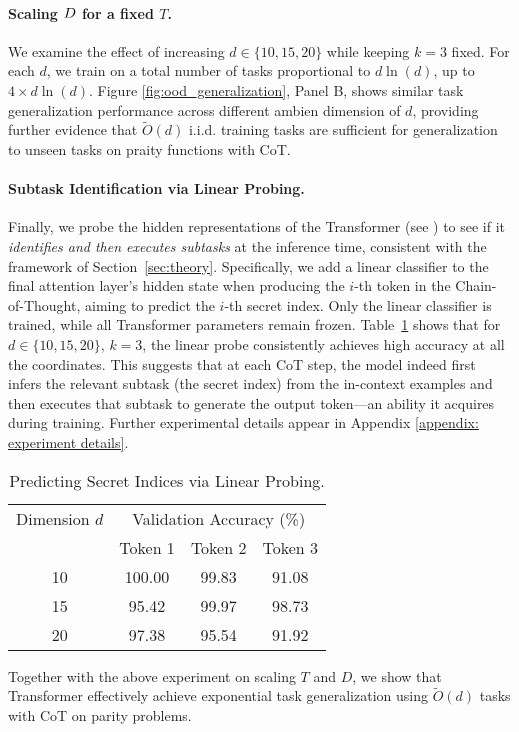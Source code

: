 \paragraph{Scaling \( D \) for a fixed \( T \).}  
We examine the effect of increasing \( d \in \{10, 15, 20\} \) while keeping \( k = 3 \) fixed. For each \( d \), we train on a total number of tasks proportional to \( d \ln(d) \), up to \( 4\times d \ln(d) \). Figure \ref{fig:ood_generalization}, Panel B, shows similar task generalization performance across different ambien dimension of \( d \), providing further evidence that \( \tilde{{O}}(d) \) i.i.d. training tasks are sufficient for generalization to unseen tasks on praity functions with CoT.


 







\paragraph{Subtask Identification via Linear Probing.}
Finally, we probe  the hidden representations of the Transformer (see \cite{alain2016understanding}) to see if it \textit{identifies and then executes subtasks} at the inference time, consistent with the framework of Section~\ref{sec:theory}. Specifically, we add a linear classifier to the final attention layer's hidden state when producing the $i$-th token in the Chain-of-Thought, aiming to predict the $i$-th secret index. Only the linear classifier is trained, while all Transformer parameters remain frozen.
Table~\ref{tab: linear probing} shows that for $d\in\{10,15,20\}$, $k=3$, the linear probe consistently achieves high accuracy at all the coordinates. This suggests that at each CoT step, the model indeed first  infers the relevant subtask (the secret index) from the in-context examples and then executes that subtask to generate the output token—an ability it acquires during training. Further experimental details appear in Appendix \ref{appendix: experiment details}. 

\begin{table}[h!]
\centering
\begin{tabular}{|c|c|c|c|}
\hline
Dimension \(d\) & \multicolumn{3}{c|}{Validation Accuracy (\%)} \\
\cline{2-4}
& Token 1 & Token 2 & Token 3 \\
\hline
10 & 100.00 & 99.83 & 91.08 \\
15 & 95.42 & 99.97 & 98.73 \\
20 & 97.38 & 95.54 & 91.92 \\
\hline
\end{tabular}
\caption{Predicting Secret Indices via Linear Probing.} 
\label{tab: linear probing}
\end{table}

Together with the above experiment on scaling $T$ and $D$, we show that Transformer effectively achieve exponential task generalization using $\tilde{O}(d)$ tasks with CoT on parity problems. 